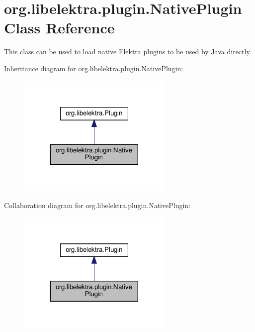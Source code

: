\hypertarget{classorg_1_1libelektra_1_1plugin_1_1NativePlugin}{}\section{org.\+libelektra.\+plugin.\+Native\+Plugin Class Reference}
\label{classorg_1_1libelektra_1_1plugin_1_1NativePlugin}


This class can be used to load native \hyperlink{interfaceorg_1_1libelektra_1_1Elektra}{Elektra} plugins to be used by Java directly.  




Inheritance diagram for org.\+libelektra.\+plugin.\+Native\+Plugin\+:
\nopagebreak
\begin{figure}[H]
\begin{center}
\leavevmode
\includegraphics[width=212pt]{classorg_1_1libelektra_1_1plugin_1_1NativePlugin__inherit__graph}
\end{center}
\end{figure}


Collaboration diagram for org.\+libelektra.\+plugin.\+Native\+Plugin\+:
\nopagebreak
\begin{figure}[H]
\begin{center}
\leavevmode
\includegraphics[width=212pt]{classorg_1_1libelektra_1_1plugin_1_1NativePlugin__coll__graph}
\end{center}
\end{figure}
